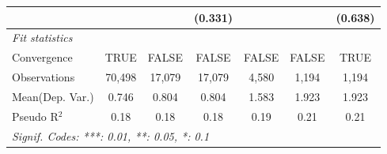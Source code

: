 \begin{tabular}{lcccccc}
                           &               &              & (0.331) &              &        & (0.638)\\   
   \midrule
   \emph{Fit statistics}\\
   Convergence             &TRUE           & FALSE        & FALSE   & FALSE        & FALSE  & TRUE\\  
   Observations            & 70,498        & 17,079       & 17,079  & 4,580        & 1,194  & 1,194\\  
Mean(Dep. Var.) & 0.746 & 0.804 & 0.804 & 1.583 & 1.923 & 1.923 \\
   Pseudo R$^2$            & 0.18          & 0.18         & 0.18    & 0.19         & 0.21   & 0.21\\  
   \midrule \midrule
   \multicolumn{7}{l}{\emph{Signif. Codes: ***: 0.01, **: 0.05, *: 0.1}}\\
\end{tabular}
\par\endgroup
